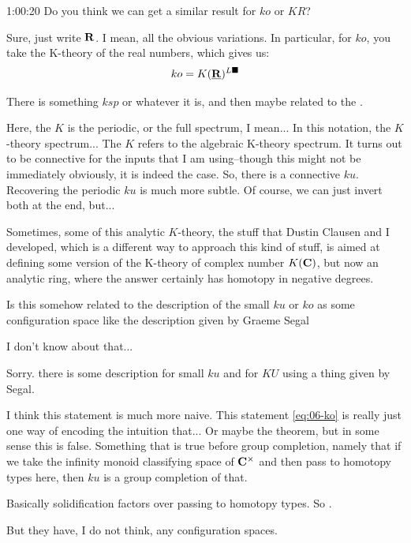 \begin{unfinished}{1:00:20}
\ques Do you think we can get a similar result for $ko$ or $KR$? 

\ans Sure, just write $\mathbf R$. I mean, all the obvious variations. In particular, for $ko$, you take the K-theory of the real numbers, which gives us:
\begin{align*} \label{eq:06-ko}
ko = K(\underline{\mathbf R})^{L\blacksquare}
\end{align*}

There is something $ksp$ or whatever it is, and then maybe related to the .


\ques Here, the $K$ is the periodic, or the full spectrum, I mean... In this notation, the $K$-theory spectrum... 
\ans The $K$ refers to the algebraic K-theory spectrum. It turns out to be connective for the inputs that I am using--though this might not be immediately obviously, it is indeed the case. So, there is a connective $ku$. Recovering the periodic $ku$ is much more subtle. Of course, we can just invert both at the end, but...

% 
Sometimes, some of this analytic $K$-theory, the stuff that Dustin Clausen and I developed, which is a different way to approach this kind of stuff, is aimed at defining some version of the K-theory of complex number $K(\mathbf C)$, but now an analytic ring, where the answer  certainly has homotopy in negative degrees.

%
\ques Is this somehow related to the description of the small $ku$ or $ko$ as some configuration space like the description given by Graeme Segal 

\ans I don't know about that...


\ques Sorry. there is some description for small $ku$ and for $KU$ using a thing given by Segal. 

\ans I think this statement is much more naive. This statement \ref{eq:06-ko} is really just one way of encoding the intuition that... 
Or maybe the theorem, but in some sense this is false. 
Something that is true before group completion, namely that if we take the infinity monoid classifying space of $\mathbf C^\times$ and then pass to homotopy types here, then $ku$ is a group completion of that. 

Basically solidification factors over passing to homotopy types. 
So .

But they have, I do not think, any configuration spaces.


\end{unfinished}
